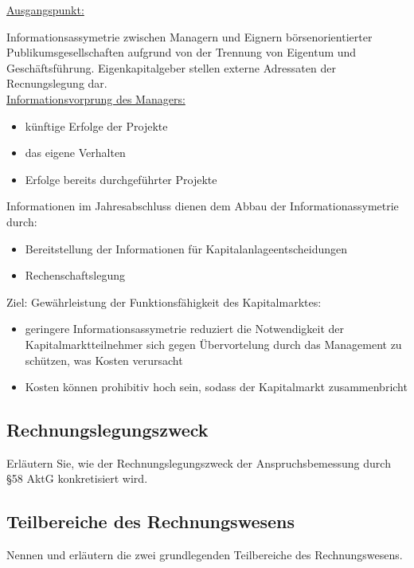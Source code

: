 \documentclass[paper=a4, fontsize=11pt]{scrartcl}
\numberwithin{equation}{section}
\numberwithin{figure}{section}
\numberwithin{table}{section}
\begin{document}
\underline{Ausgangspunkt:}

Informationsassymetrie zwischen Managern und Eignern börsenorientierter Publikumsgesellschaften aufgrund von der Trennung von Eigentum und Geschäftsführung.
Eigenkapitalgeber stellen externe Adressaten der Recnungslegung dar. \\

\underline{Informationsvorprung des Managers:}

\begin{itemize}
  \item künftige Erfolge der Projekte
  \item das eigene Verhalten
  \item Erfolge bereits durchgeführter Projekte
\end{itemize}

Informationen im Jahresabschluss dienen dem Abbau der Informationassymetrie durch:

\begin{itemize}
  \item Bereitstellung der Informationen für Kapitalanlageentscheidungen
  \item Rechenschaftslegung
\end{itemize}

Ziel: Gewährleistung der Funktionsfähigkeit des Kapitalmarktes:

\begin{itemize}
  \item geringere Informationsassymetrie reduziert die Notwendigkeit der Kapitalmarktteilnehmer
  sich gegen Übervortelung durch das Management zu schützen, was Kosten verursacht
  \item Kosten können prohibitiv hoch sein, sodass der Kapitalmarkt zusammenbricht
\end{itemize}

\subsection{Rechnungslegungszweck}
Erläutern Sie, wie der Rechnungslegungszweck der Anspruchsbemessung durch \S 58 AktG konkretisiert wird. \\
\subsection{Teilbereiche des Rechnungswesens}
Nennen und erläutern die zwei grundlegenden Teilbereiche des Rechnungswesens. \\
\end{document}
